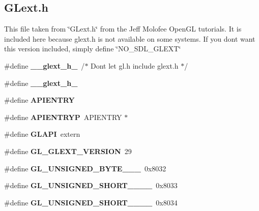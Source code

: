 \subsection*{G\+Lext.\+h}
\label{_amgrp55d5a26c0121f90ea7b8766a275e1771}%
This file taken from \char`\"{}\+G\+Lext.\+h\char`\"{} from the Jeff Molofee Open\+G\+L tutorials. It is included here because glext.\+h is not available on some systems. If you don\textquotesingle{}t want this version included, simply define \char`\"{}\+N\+O\+\_\+\+S\+D\+L\+\_\+\+G\+L\+E\+X\+T\char`\"{} \begin{DoxyCompactItemize}
\item 
\#define {\bfseries \+\_\+\+\_\+glext\+\_\+h\+\_\+}~/$\ast$ Don\textquotesingle{}t let gl.\+h include glext.\+h $\ast$/\label{_s_d_l__opengl_8h_af15549ea63f411c3ca673e7c6dc8acae}

\item 
\#define {\bfseries \+\_\+\+\_\+glext\+\_\+h\+\_\+}\label{_s_d_l__opengl_8h_af15549ea63f411c3ca673e7c6dc8acae}

\item 
\#define {\bfseries A\+P\+I\+E\+N\+T\+R\+Y}\label{_s_d_l__opengl_8h_a428a91acf2c2439dc1a257708ee1f805}

\item 
\#define {\bfseries A\+P\+I\+E\+N\+T\+R\+Y\+P}~A\+P\+I\+E\+N\+T\+R\+Y $\ast$\label{_s_d_l__opengl_8h_aef0d9e5e275e1b7becf54b6aa9ce3911}

\item 
\#define {\bfseries G\+L\+A\+P\+I}~extern\label{_s_d_l__opengl_8h_abad5ea874b73fa802c9ac0f5488bf9b5}

\item 
\#define {\bfseries G\+L\+\_\+\+G\+L\+E\+X\+T\+\_\+\+V\+E\+R\+S\+I\+O\+N}~29\label{_s_d_l__opengl_8h_ad37d7f259ec4a57d3cecee6932acb4ff}

\item 
\#define {\bfseries G\+L\+\_\+\+U\+N\+S\+I\+G\+N\+E\+D\+\_\+\+B\+Y\+T\+E\+\_\+\_\+\_}~0x8032\label{_s_d_l__opengl_8h_ad57d095154f5964429dc149add582257}

\item 
\#define {\bfseries G\+L\+\_\+\+U\+N\+S\+I\+G\+N\+E\+D\+\_\+\+S\+H\+O\+R\+T\+\_\+\_\+\_\+\_}~0x8033\label{_s_d_l__opengl_8h_ada3c99cc89e14622e4c62b911fda24fd}

\item 
\#define {\bfseries G\+L\+\_\+\+U\+N\+S\+I\+G\+N\+E\+D\+\_\+\+S\+H\+O\+R\+T\+\_\+\_\+\_\+\_}~0x8034\label{_s_d_l__opengl_8h_a654599021b9e26bd6feb4c7cd001ef7f}


\end{DoxyCompactItemize}
